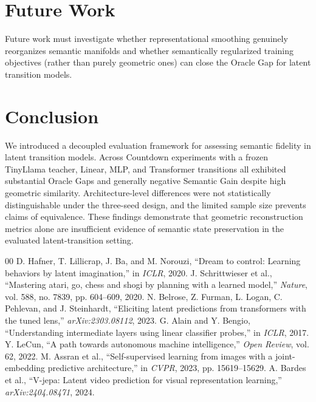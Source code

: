 \documentclass[conference]{IEEEtran}
\begin{document}
\section{Future Work}
Future work must investigate whether representational smoothing genuinely reorganizes semantic manifolds and whether semantically regularized training objectives (rather than purely geometric ones) can close the Oracle Gap for latent transition models.

\section{Conclusion}
We introduced a decoupled evaluation framework for assessing semantic fidelity in latent transition models. Across Countdown experiments with a frozen TinyLlama teacher, Linear, MLP, and Transformer transitions all exhibited substantial Oracle Gaps and generally negative Semantic Gain despite high geometric similarity. Architecture-level differences were not statistically distinguishable under the three-seed design, and the limited sample size prevents claims of equivalence. These findings demonstrate that geometric reconstruction metrics alone are insufficient evidence of semantic state preservation in the evaluated latent-transition setting.

\begin{thebibliography}{00}
 D. Hafner, T. Lillicrap, J. Ba, and M. Norouzi, ``Dream to control: Learning behaviors by latent imagination,'' in \textit{ICLR}, 2020.
 J. Schrittwieser et al., ``Mastering atari, go, chess and shogi by planning with a learned model,'' \textit{Nature}, vol. 588, no. 7839, pp. 604--609, 2020.
 N. Belrose, Z. Furman, L. Logan, C. Pehlevan, and J. Steinhardt, ``Eliciting latent predictions from transformers with the tuned lens,'' \textit{arXiv:2303.08112}, 2023.
 G. Alain and Y. Bengio, ``Understanding intermediate layers using linear classifier probes,'' in \textit{ICLR}, 2017.
 Y. LeCun, ``A path towards autonomous machine intelligence,'' \textit{Open Review}, vol. 62, 2022.
 M. Assran et al., ``Self-supervised learning from images with a joint-embedding predictive architecture,'' in \textit{CVPR}, 2023, pp. 15619--15629.
 A. Bardes et al., ``V-jepa: Latent video prediction for visual representation learning,'' \textit{arXiv:2404.08471}, 2024.
\end{thebibliography}
\end{document}
